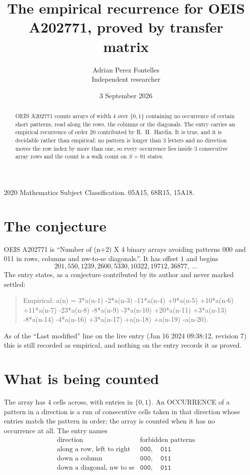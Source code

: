 \documentclass[11pt,a4paper]{article}
\title{The empirical recurrence for OEIS A202771, proved by transfer matrix}
\author{Adrian Perez Fontelles\\ \small Independent researcher}
\date{3 September 2026}
\theoremstyle{plain}
\theoremstyle{definition}
\begin{document}
\maketitle

\begin{abstract}
OEIS A202771 counts arrays of width $4$ over $\{0,1\}$ containing no occurrence of certain short
patterns, read along the rows, the columns or the diagonals. The entry carries an empirical
recurrence of order $20$ contributed by R.~H.~Hardin. It is true, and it is decidable
rather than empirical: no pattern is longer than $3$ letters and no direction moves the row
index by more than one, so every occurrence lies inside $3$ consecutive array rows and the
count is a walk count on $S=91$ states.
\end{abstract}

\noindent\small 2020 Mathematics Subject Classification. 05A15, 68R15, 15A18.\normalsize

\section{The conjecture}

OEIS A202771 is ``Number of (n+2) X 4 binary arrays avoiding patterns 000 and 011 in rows, columns and nw-to-se diagonals.''. It has offset $1$ and begins
\[
201, 550, 1239, 2600, 5330, 10322, 19712, 36877,\ \dots
\]
The entry states, as a conjecture contributed by its author and never marked settled:
\begin{quote}
Empirical: a(n) = 3*a(n-1) -2*a(n-3) -11*a(n-4) +9*a(n-5) +10*a(n-6) +11*a(n-7) -23*a(n-8) -8*a(n-9) -3*a(n-10) +20*a(n-11) +3*a(n-13) -8*a(n-14) -4*a(n-16) +3*a(n-17) +a(n-18) +a(n-19) -a(n-20).
\end{quote}
As of the ``Last modified'' line on the live entry (Jan 16 2024 09:38:12, revision 7) this is still
recorded as empirical, and nothing on the entry records it as proved.

\section{What is being counted}

The array has $4$ cells across, with entries in $\{0,1\}$. An OCCURRENCE of a pattern in a
direction is a run of consecutive cells taken in that direction whose entries match the pattern
in order; the array is counted when it has no occurrence at all. The entry names
\[
\begin{array}{ll}
\text{direction} & \text{forbidden patterns} \\[2pt]
\text{along a row, left to right} & \mathtt{000},\quad \mathtt{011} \\
\text{down a column} & \mathtt{000},\quad \mathtt{011} \\
\text{down a diagonal, nw to se} & \mathtt{000},\quad \mathtt{011} \\
\end{array}
\]
\end{document}
